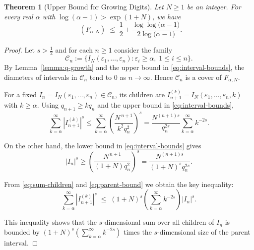 \documentclass[12pt]{article}
\newtheorem{theorem}{Theorem}[section]
\newcommand{\I}{I_N}
\numberwithin{equation}{section}
\DeclareMathOperator{\dimH}{dim_H}
\begin{document}
\begin{theorem}[Upper Bound for Growing Digits] \label{upperbound:Good2N}
Let $N \geq 1$ be an integer. For every real $\alpha$ with $\log(\alpha-1) > \exp(1+N)$, we have
\begin{equation}\label{eq:upper-ineq}
\dimH(F_{\alpha,N}) 
\;\le\; 
\frac12 + \frac{\log\log\!\bigl({\alpha}-1\bigr)}{2\log\!\bigl({\alpha}-1\bigr)}.
\end{equation}
\end{theorem}
\begin{proof} 
Let $s > \tfrac12$ and for each $n \geq 1$ consider the family
\[
\mathcal{C}_n := \{ \I(\varepsilon_1, \dots, \varepsilon_n) : \varepsilon_i \geq \alpha,\; 1 \leq i \leq n \}.
\]
By Lemma~\ref{lemma:q-growth} and the upper bound in \eqref{eq:interval-bounds}, 
the diameters of intervals in $\mathcal{C}_n$ tend to $0$ as $n \to \infty$. Hence $\mathcal{C}_n$ is a cover of $F_{\alpha,N}$.

For a fixed $I_n = \I(\varepsilon_1,\dots,\varepsilon_n) \in \mathcal{C}_n$, its children are 
$I_{n+1}^{(k)} = \I(\varepsilon_1,\dots,\varepsilon_n,k)$ with $k \geq \alpha$. 
Using $q_{n+1} \geq k q_n$ and the upper bound in \eqref{eq:interval-bounds},
\begin{equation}
\sum_{k=\alpha}^{\infty} |I_{n+1}^{(k)}|^s 
   \leq \sum_{k=\alpha}^{\infty} \left( \frac{N^{\,n+1}}{k^2 q_n^{2}} \right)^s
   = \frac{N^{(n+1)s}}{q_n^{2s}} \sum_{k=\alpha}^{\infty} k^{-2s}.
\label{eq:sum-children}
\end{equation}

On the other hand, the lower bound in \eqref{eq:interval-bounds} gives
\begin{equation}\label{eq:parent-bound}
|I_n|^s \geq \left( \frac{N^{\,n+1}}{(1+N) q_n^{2}} \right)^s 
        = \frac{N^{(n+1)s}}{(1+N)^s q_n^{2s}}.
\end{equation}

From \eqref{eq:sum-children} and \eqref{eq:parent-bound} we obtain the key inequality:
\begin{equation}\label{eq:children-parent}
\sum_{k=\alpha}^{\infty} |I_{n+1}^{(k)}|^s 
\; \leq \; (1+N)^s \left( \sum_{k=\alpha}^{\infty} k^{-2s} \right) |I_n|^s .
\end{equation}

This inequality shows that the $s$-dimensional sum over all children of $I_n$ is bounded by 
$(1+N)^s \left( \sum_{k=\alpha}^{\infty} k^{-2s} \right)$ times the $s$-dimensional size of the parent interval.


\end{proof}
\end{document}
